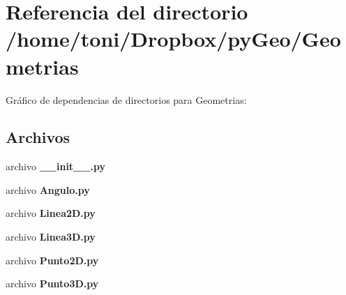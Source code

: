 \section{Referencia del directorio /home/toni/\-Dropbox/py\-Geo/\-Geometrias}
\label{dir_0cdfd5b776f63408fad74813cf250bef}
Gráfico de dependencias de directorios para Geometrias\-:
\subsection*{Archivos}
\begin{DoxyCompactItemize}
\item 
archivo {\bf \-\_\-\-\_\-init\-\_\-\-\_\-.\-py}
\item 
archivo {\bf Angulo.\-py}
\item 
archivo {\bf Linea2\-D.\-py}
\item 
archivo {\bf Linea3\-D.\-py}
\item 
archivo {\bf Punto2\-D.\-py}
\item 
archivo {\bf Punto3\-D.\-py}
\end{DoxyCompactItemize}
